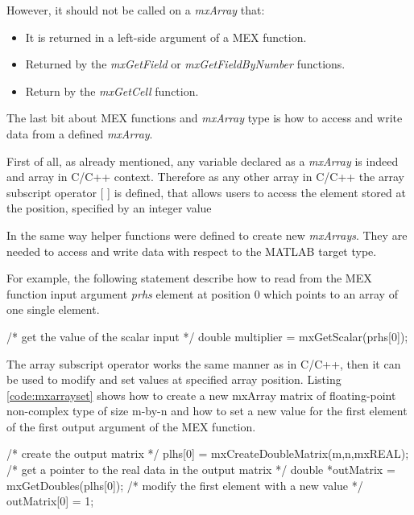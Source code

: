 \documentclass[12pt,a4paper]{extarticle}
\newcommand{\linespace}{\vspace{0pt}}
\begin{document}
However, it should not be called on a \textit{mxArray} that:
\begin{itemize}
\item It is returned in a left-side argument of a MEX function.
\item Returned by the \textit{mxGetField} or \textit{mxGetFieldByNumber} functions.
\item Return by the \textit{mxGetCell} function.
\end{itemize}

The last bit about MEX functions and \textit{mxArray} type is how to access and write data from a defined \textit{mxArray}.

First of all, as already mentioned, any variable declared as a \textit{mxArray} is indeed and array in C/C++ context. Therefore as any other array in C/C++ the array subscript operator [ ] is defined, that allows users to access the element stored at the position, specified by an integer value \cite{cpp_tut} %
\linespace

In the same way helper functions were defined to create new \textit{mxArrays}. They are needed to access and write data with respect to the MATLAB target type.

For example, the following statement describe how to read from the MEX function input argument \textit{prhs} element at position 0 which points to an array of one single element.

\begin{cpp}[caption={Accessing the first non-imaginary element of the mxArray pointer passed as argument from the MEX function input arguments},label=code:mxarraygetscalar]
/* get the value of the scalar input  */
double multiplier = mxGetScalar(prhs[0]);
\end{cpp}

The array subscript operator works the same manner as in C/C++, then it can be used to modify and set values at specified array position. Listing \ref{code:mxarrayset} shows how to create a new mxArray matrix of floating-point non-complex type of size m-by-n and how to set a new value for the first element of the first output argument of the MEX function.

\begin{cpp}[caption={Create the output matrix corresponding to the first output array. Get the pointer to the real data and set a new value for the first element},label=code:mxarrayset]
/* create the output matrix */
plhs[0] = mxCreateDoubleMatrix(m,n,mxREAL);
/* get a pointer to the real data in the output matrix */
double *outMatrix = mxGetDoubles(plhs[0]);
/* modify the first element with a new value */
outMatrix[0] = 1;
\end{cpp}
\end{document}
